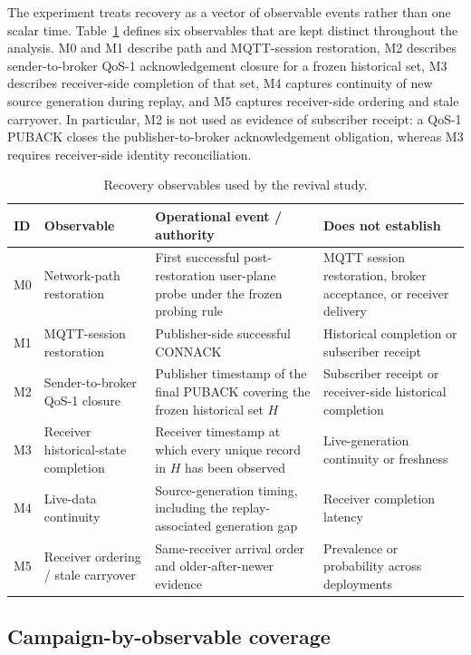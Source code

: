 \documentclass[journal]{IEEEtran}
\begin{document}
The experiment treats recovery as a vector of observable events rather than one scalar time. Table~\ref{tab:observables} defines six observables that are kept distinct throughout the analysis. M0 and M1 describe path and MQTT-session restoration, M2 describes sender-to-broker QoS-1 acknowledgement closure for a frozen historical set, M3 describes receiver-side completion of that set, M4 captures continuity of new source generation during replay, and M5 captures receiver-side ordering and stale carryover. In particular, M2 is not used as evidence of subscriber receipt: a QoS-1 PUBACK closes the publisher-to-broker acknowledgement obligation, whereas M3 requires receiver-side identity reconciliation.

\begin{table}[t]
\centering
\small
\caption{Recovery observables used by the revival study.}
\label{tab:observables}
\begin{tabular}{p{}p{}p{}p{}}
\toprule
\textbf{ID} & \textbf{Observable} & \textbf{Operational event / authority} & \textbf{Does not establish} \\
\midrule
M0 & Network-path restoration & First successful post-restoration user-plane probe under the frozen probing rule & MQTT session restoration, broker acceptance, or receiver delivery \\
M1 & MQTT-session restoration & Publisher-side successful CONNACK & Historical completion or subscriber receipt \\
M2 & Sender-to-broker QoS-1 closure & Publisher timestamp of the final PUBACK covering the frozen historical set $H$ & Subscriber receipt or receiver-side historical completion \\
M3 & Receiver historical-state completion & Receiver timestamp at which every unique record in $H$ has been observed & Live-generation continuity or freshness \\
M4 & Live-data continuity & Source-generation timing, including the replay-associated generation gap & Receiver completion latency \\
M5 & Receiver ordering / stale carryover & Same-receiver arrival order and older-after-newer evidence & Prevalence or probability across deployments \\
\bottomrule
\end{tabular}
\end{table}

\subsection{Campaign-by-observable coverage}
\end{document}
